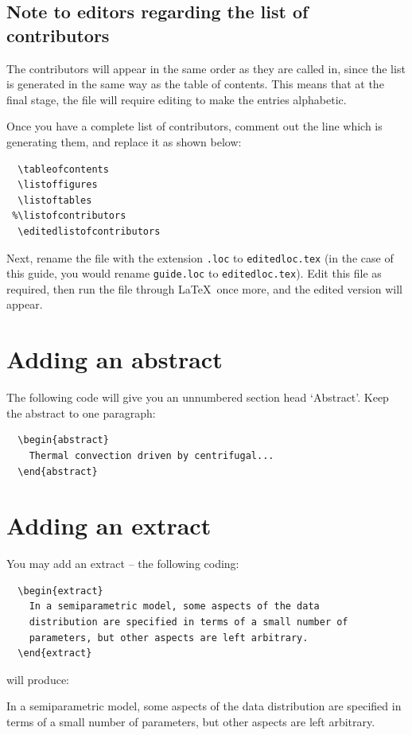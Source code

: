\subsection{Note to editors regarding the list of contributors}

The contributors will appear in the same order as they are called in, since the list is generated in the same way as the table of contents. This means that at the final stage, the file will require editing to make the entries alphabetic.

Once you have a complete list of contributors, comment out the line which is generating them, and replace it as shown below:
\begin{verbatim}
  \tableofcontents
  \listoffigures
  \listoftables
 %\listofcontributors
  \editedlistofcontributors
\end{verbatim}
Next, rename the file with the extension \verb".loc" to \verb"editedloc.tex" (in the case of this guide, you would rename \texttt{\cambridge guide.loc} to \verb"editedloc.tex"). Edit this file as required, then run the file through \LaTeX\ once more, and the edited version will appear.

\section{Adding an abstract}
The following code will give you an unnumbered section head `Abstract'. Keep the abstract to one paragraph:
\begin{verbatim}
  \begin{abstract}
    Thermal convection driven by centrifugal...
  \end{abstract}
\end{verbatim}

\section{Adding an extract}
You may add an extract -- the following coding:
\begin{verbatim}
  \begin{extract}
    In a semiparametric model, some aspects of the data
    distribution are specified in terms of a small number of
    parameters, but other aspects are left arbitrary.
  \end{extract}
\end{verbatim}
will produce:
  \begin{extract}
    In a semiparametric model, some aspects of the data
    distribution are specified in terms of a small number of
    parameters, but other aspects are left arbitrary.
  \end{extract}


